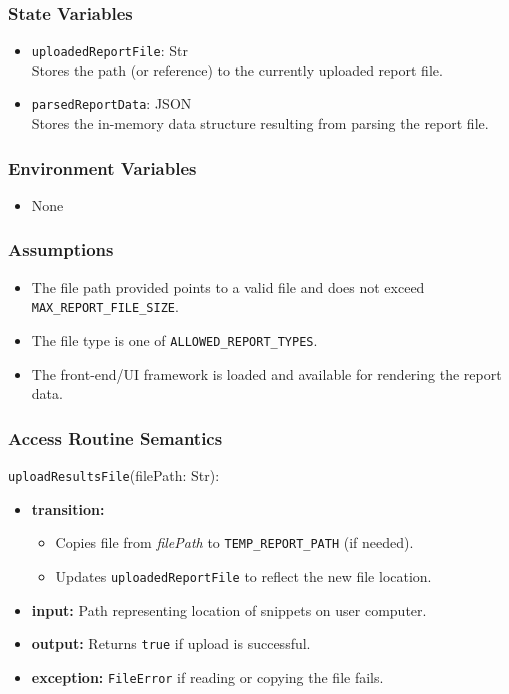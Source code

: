 \documentclass[12pt, titlepage]{article}
\begin{document}
\begin{itemize}
\subsubsection{State Variables}

\begin{itemize}
    \item \texttt{uploadedReportFile}: Str \\
    Stores the path (or reference) to the currently uploaded report file.
    \item \texttt{parsedReportData}: JSON \\
     Stores the in-memory data structure resulting from parsing the report file.
\end{itemize}

\subsubsection{Environment Variables}

\begin{itemize}
    \item None
\end{itemize}

\subsubsection{Assumptions}

\begin{itemize}
    \item The file path provided points to a valid file and does not exceed \texttt{MAX\_REPORT\_FILE\_SIZE}.
    \item The file type is one of \texttt{ALLOWED\_REPORT\_TYPES}.
    \item The front-end/UI framework is loaded and available for rendering the report data.
\end{itemize}

\subsubsection{Access Routine Semantics}

\noindent \texttt{uploadResultsFile}(filePath: Str):
\begin{itemize}
    \item \textbf{transition:}
    \begin{itemize}
        \item Copies file from \textit{filePath} to \texttt{TEMP\_REPORT\_PATH} (if needed).
        \item Updates \texttt{uploadedReportFile} to reflect the new file location.
    \end{itemize}
    \item \textbf{input:} Path representing location of snippets on user computer.
    \item \textbf{output:} Returns \texttt{true} if upload is successful.
    \item \textbf{exception:} \texttt{FileError} if reading or copying the file fails.
\end{itemize}


\end{itemize}
\end{document}
